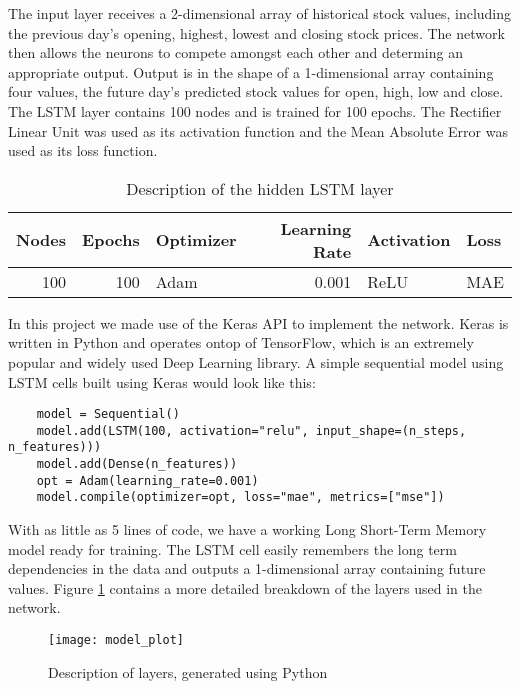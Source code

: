 The input layer receives a 2-dimensional array of historical stock values, including the previous day's opening, highest, lowest and closing stock prices. The network then allows the neurons to compete amongst each other and determing an appropriate output. Output is in the shape of a 1-dimensional array containing four values, the future day's predicted stock values for open, high, low and close. The LSTM layer contains 100 nodes and is trained for 100 epochs. The Rectifier Linear Unit was used as its activation function and the Mean Absolute Error was used as its loss function.

\begin{table}[H]
    \centering
    \begin{tabular}{|r|r|l|r|l|l|}
        \hline
        \textbf{Nodes} & \textbf{Epochs} & \textbf{Optimizer} & \textbf{Learning Rate} & \textbf{Activation} & \textbf{Loss} \\ \hline
        100            & 100             & Adam               & 0.001                  & ReLU                & MAE           \\ \hline
        \end{tabular}
    \caption{Description of the hidden LSTM layer}
    \label{tab:lstm_layer}
\end{table}

In this project we made use of the Keras API to implement the network. Keras is written in Python and operates ontop of TensorFlow, which is an extremely popular and widely used Deep Learning library. A simple sequential model using LSTM cells built using Keras would look like this:

\begin{verbatim}
    model = Sequential()
    model.add(LSTM(100, activation="relu", input_shape=(n_steps, n_features)))
    model.add(Dense(n_features))
    opt = Adam(learning_rate=0.001)
    model.compile(optimizer=opt, loss="mae", metrics=["mse"])
\end{verbatim}

With as little as 5 lines of code, we have a working Long Short-Term Memory model ready for training. The LSTM cell easily remembers the long term dependencies in the data and outputs a 1-dimensional array containing future values. Figure \ref{tab:layer_description} contains a more detailed breakdown of the layers used in the network.

\begin{figure}[H]
    \centering
    \texttt{[image: model\_plot]}
    \caption{Description of layers, generated using Python}
    \label{tab:layer_description}
\end{figure}

